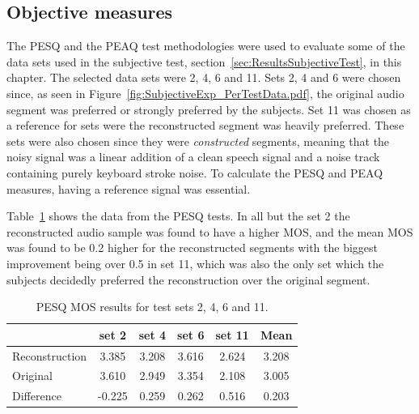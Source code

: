 \subsection{Objective measures}
The PESQ and the PEAQ test methodologies were used to evaluate some of the data sets used in the subjective test, section~\ref{sec:ResultsSubjectiveTest}, in this chapter. The selected data sets were 2, 4, 6 and 11. Sets 2, 4 and 6 were chosen since, as seen in Figure~\ref{fig:SubjectiveExp_PerTestData.pdf}, the original audio segment was preferred or strongly preferred by the subjects. Set 11 was chosen as a reference for sets were the reconstructed segment was heavily preferred. These sets were also chosen since they were \emph{constructed} segments, meaning that the noisy signal was a linear addition of a clean speech signal and a noise track containing purely keyboard stroke noise. To calculate the PESQ and PEAQ measures, having a reference signal was essential.

Table~\ref{tab:PESQdata} shows the data from the PESQ tests. In all but the set 2 the reconstructed audio sample was found to have a higher MOS, and the mean MOS was found to be 0.2 higher for the reconstructed segments with the biggest improvement being over 0.5 in set 11, which was also the only set which the subjects decidedly preferred the reconstruction over the original segment.

\begin{table}\begin{center}
\caption{PESQ MOS results for test sets 2, 4, 6 and 11.}
\label{tab:PESQdata}
\begin{tabular}{|l|c|c|c|c|c|}\hline
                    & set 2 & set 4 & set 6 & set 11  & Mean \\ \hline
  Reconstruction    & 3.385 & 3.208 & 3.616 & 2.624   & 3.208 \\
  Original          & 3.610 & 2.949 & 3.354 & 2.108   & 3.005 \\ \hline
  Difference        & -0.225& 0.259 & 0.262 & 0.516   & 0.203 \\
  \hline
\end{tabular}\end{center}\end{table}



